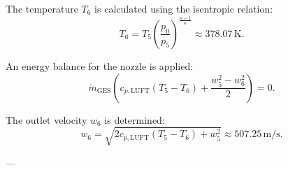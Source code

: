 The temperature \( T_6 \) is calculated using the isentropic relation:  
\[
T_6 = T_5 \left( \frac{p_0}{p_5} \right)^{\frac{\kappa - 1}{\kappa}} \approx 378.07 \, \text{K}.
\]  

An energy balance for the nozzle is applied:  
\[
\dot{m}_{\text{GES}} \left( c_{p,\text{LUFT}} (T_5 - T_6) + \frac{w_5^2 - w_6^2}{2} \right) = 0.
\]  

The outlet velocity \( w_6 \) is determined:  
\[
w_6 = \sqrt{2 c_{p,\text{LUFT}} (T_5 - T_6) + w_5^2} \approx 507.25 \, \text{m/s}.
\]  

---